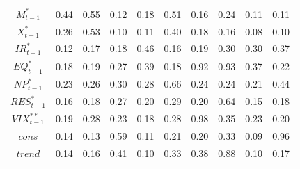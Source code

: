 \documentclass[a4paper, twoside]{templates/ociamthesis}
\begin{document}
\begin{table}[!ht]
\begin{tabular}[t]{cccccccccc}
$M^*_{t-1}$ & 0.44 & 0.55 & 0.12 & 0.18 & 0.51 & 0.16 & 0.24 & 0.11 & 0.11\\
$X^*_{t-1}$ & 0.26 & 0.53 & 0.10 & 0.11 & 0.40 & 0.18 & 0.16 & 0.08 & 0.10\\
$IR^*_{t-1}$ & 0.12 & 0.17 & 0.18 & 0.46 & 0.16 & 0.19 & 0.30 & 0.30 & 0.37\\
$EQ^*_{t-1}$ & 0.18 & 0.19 & 0.27 & 0.39 & 0.18 & 0.92 & 0.93 & 0.37 & 0.22\\
$NP^*_{t-1}$ & 0.23 & 0.26 & 0.30 & 0.28 & 0.66 & 0.24 & 0.24 & 0.21 & 0.44\\
$RES^*_{t-1}$ & 0.16 & 0.18 & 0.27 & 0.20 & 0.29 & 0.20 & 0.64 & 0.15 & 0.18\\
$VIX^{**}_{t-1}$ & 0.19 & 0.28 & 0.23 & 0.18 & 0.28 & 0.98 & 0.35 & 0.23 & 0.20\\
$cons$ & 0.14 & 0.13 & 0.59 & 0.11 & 0.21 & 0.20 & 0.33 & 0.09 & 0.96\\
$trend$ & 0.14 & 0.16 & 0.41 & 0.10 & 0.33 & 0.38 & 0.88 & 0.10 & 0.17\\
\bottomrule
\end{tabular}
\end{table}

\clearpage
\end{document}
